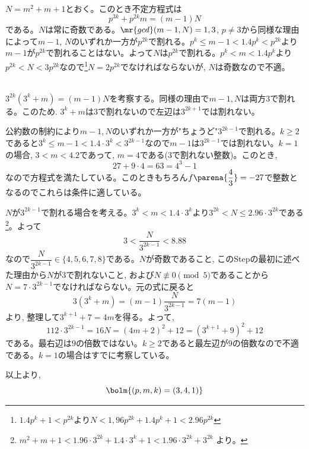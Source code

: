 \\
$N = m^2 + m +1$とおく。このとき不定方程式は
\[p^{3k} + p^{2k}m = (m-1)N\]
である。$N$は常に奇数である。$\mr{gcd}(m-1,N) = 1,3$, $p\neq 3$から同様な理由によって$m-1$, $N$のいずれか一方が$p^{2k}$で割れる。$p^{k} \leq m-1 < 1.4 p^{k} < p^{2k}$より$m-1$が$p^{2k}$で割れることはない。よって$N$は$p^{2k}$で割れる。$p^{k} < m < 1.4p^{k}$より$p^{2k} < N < 3p^{2k}$なので\footnote{$1.4p^{k} + 1 < p^{2k}$より$N < 1,96p^{2k} + 1.4p^{k} + 1<2.96p^{2k}$}$N = 2p^{2k}$でなければならないが, $N$は奇数なので不適。\par
{}\\
$3^{2k}(3^{k} + m) = (m-1)N$を考察する。同様の理由で$m-1,N$は両方$3$で割れる。このため. $3^{k} + m$は$3$で割れないので左辺は$3^{2k+1}$では割れない。\par
公約数の制約により$m-1,N$のいずれか一方が"ちょうど"$3^{2k-1}$で割れる。$k\geq 2$であると$3^{k}\leq m-1 < 1.4\cdot  3^{k} < 3^{2k-1}$なので$m-1$は$3^{2k-1}$では割れない。$k=1$の場合, $3<m<4.2$であって, $m=4$である($3$で割れない整数)。このとき,
\[27 + 9\cdot 4 = 63 = 4^{3} - 1\]
なので方程式を満たしている。このときもちろん$f\parena{\dfrac{4}{3}} = -27$で整数となるのでこれらは条件に適している。\par
$N$が$3^{2k-1}$で割れる場合を考える。$3^{k} < m < 1.4 \cdot 3^{k}$より$3^{2k} < N \leq 2.96\cdot 3^{2k}$である\footnote{$m^2 + m + 1 < 1.96\cdot 3^{2k} + 1.4\cdot 3^{k} + 1<1.96\cdot 3^{2k} + 3^{2k}$ より。}。よって
\[3 < \dfrac{N}{3^{2k-1}} < 8.88\]
なので$\dfrac{N}{3^{2k-1}} \in \{ 4,5,6,7,8 \}$である。$N$が奇数であること, このStepの最初に述べた理由から$N$が$3$で割れないこと, および$N\not\equiv 0\pmod{5}$であることから$N=7\cdot 3^{2k-1}$でなければならない。元の式に戻ると
\[3(3^{k} + m) = (m-1)\dfrac{N}{3^{2k-1}} = 7(m-1)\]
より, 整理して$3^{k+1} + 7 = 4m$を得る。よって,
\[112\cdot 3^{2k-1} = 16N = (4m+2)^2 + 12 = (3^{k+1} + 9)^{2} + 12\]
である。最右辺は$9$の倍数ではない。$k\geq 2$であると最左辺が$9$の倍数なので不適である。$k=1$の場合はすでに考察している。\par
以上より,
\[\bolm{(p,m,k) = (3,4,1)}\]
